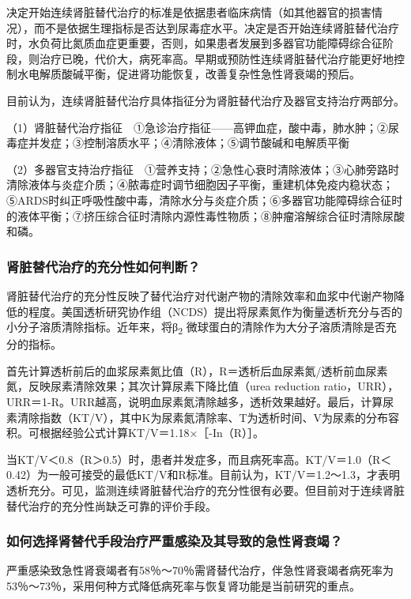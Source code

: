 决定开始连续肾脏替代治疗的标准是依据患者临床病情（如其他器官的损害情况），而不是依据生理指标是否达到尿毒症水平。决定是否开始连续肾脏替代治疗时，水负荷比氮质血症更重要，否则，如果患者发展到多器官功能障碍综合征阶段，则治疗已晚，代价大，病死率高。早期或预防性连续肾脏替代治疗能更好地控制水电解质酸碱平衡，促进肾功能恢复，改善复杂性急性肾衰竭的预后。

目前认为，连续肾脏替代治疗具体指征分为肾脏替代治疗及器官支持治疗两部分。

（1）肾脏替代治疗指征　①急诊治疗指征------高钾血症，酸中毒，肺水肿；②尿毒症并发症；③控制溶质水平；④清除液体；⑤调节酸碱和电解质平衡

（2）多器官支持治疗指征　①营养支持；②急性心衰时清除液体；③心肺旁路时清除液体与炎症介质；④脓毒症时调节细胞因子平衡，重建机体免疫内稳状态；⑤ARDS时纠正呼吸性酸中毒，清除水分与炎症介质；⑥多器官功能障碍综合征时的液体平衡；⑦挤压综合征时清除内源性毒性物质；⑧肿瘤溶解综合征时清除尿酸和磷。

\subsubsection{肾脏替代治疗的充分性如何判断？}

肾脏替代治疗的充分性反映了替代治疗对代谢产物的清除效率和血浆中代谢产物降低的程度。美国透析研究协作组（NCDS）提出将尿素氮作为衡量透析充分与否的小分子溶质清除指标。近年来，将β\textsubscript{2}
微球蛋白的清除作为大分子溶质清除是否充分的指标。

首先计算透析前后的血浆尿素氮比值（R），R＝透析后血尿素氮/透析前血尿素氮，反映尿素清除效果；其次计算尿素下降比值（urea
reduction
ratio，URR），URR＝1-R。URR越高，说明血尿素氮清除越多，透析效果越好。最后，计算尿素清除指数（KT/V），其中K为尿素氮清除率、T为透析时间、V为尿素的分布容积。可根据经验公式计算KT/V＝1.18×［-In（R）］。

当KT/V＜0.8（R＞0.5）时，患者并发症多，而且病死率高。KT/V＝1.0（R＜0.42）为一般可接受的最低KT/V和R标准。目前认为，KT/V＝1.2～1.3，才表明透析充分。可见，监测连续肾脏替代治疗的充分性很有必要。但目前对于连续肾脏替代治疗的充分性尚缺乏可靠的评价手段。

\subsubsection{如何选择肾替代手段治疗严重感染及其导致的急性肾衰竭？}

严重感染致急性肾衰竭者有58％～70％需肾替代治疗，伴急性肾衰竭者病死率为53％～73％，采用何种方式降低病死率与恢复肾功能是当前研究的重点。

